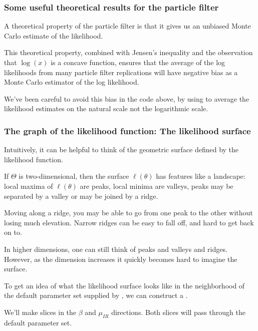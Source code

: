 \documentclass{beamer}\usepackage[]{graphicx}\usepackage[]{color}
\begin{document}
\begin{frame}[fragile]

\frametitle{Some useful theoretical results for the particle filter}
\bi
\item  A theoretical property of the particle filter is that it gives us an unbiased Monte Carlo estimate of the likelihood.

\item  This theoretical property, combined with Jensen's inequality and the observation that $\log(x)$ is a concave function, ensures that the average of the log likelihoods from many particle filter replications will have negative bias as a Monte Carlo estimator of the log likelihood.

\item  We've been careful to avoid this bias in the code above, by using  to average the likelihood estimates on the natural scale not the logarithmic scale.
\ei

\end{frame}  

 \begin{frame}[fragile]

\frametitle{The graph of the likelihood function: The likelihood surface}

\bi

\item  Intuitively, it can be helpful to think of the geometric surface defined by the likelihood function. 

\item  If $\Theta$ is two-dimensional, then the surface $\ell(\theta)$ has features like a landscape: local maxima of $\ell(\theta)$ are peaks,  local minima are valleys,  peaks may be separated by a valley or may be joined by a ridge. 

\item Moving along a ridge, you may be able to go from one peak to the other without losing much elevation. Narrow ridges can be easy to fall off, and hard to get back on to.

\item  In higher dimensions, one can still think of peaks and valleys and ridges. However, as the dimension increases it quickly becomes hard to imagine the surface.

\item  To get an idea of what the likelihood surface looks like in the neighborhood of the default parameter set supplied by , we can construct a .

\item  We'll make slices in the $\beta$ and $\mu_{IR}$ directions.
Both slices will pass through the default parameter set.

\ei
\end{frame}
\end{document}
